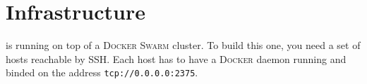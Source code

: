 
\section{Infrastructure}
\label{sec:infrastructure}

\GP{} is running on top of a \textsc{Docker Swarm} cluster.
To build this one, you need a set of hosts reachable by SSH.
Each host has to have a \textsc{Docker} daemon running and binded on the address \texttt{tcp://0.0.0.0:2375}.
